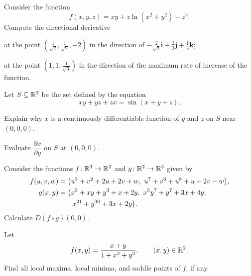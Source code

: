 \begin{problem}
Consider the function
\[
f(x, y, z)=xy+z\ln(x^2+y^2)-z^3.
\]
Compute the directional derivative
\begin{problemsubparts}
\item at the point $\left(\frac{1}{\sqrt2}, \frac{1}{\sqrt2}, -2\right)$ in the direction of $-\frac{2}{\sqrt2}\mathbf i+\frac23\mathbf j+\frac13\mathbf k$;
\item at the point $\left(1, 1, \frac{1}{\sqrt3}\right)$ in the direction of the maximum rate of increase of the function.
\end{problemsubparts}
\end{problem}

\begin{problem}
Let $S\subseteq\mathbb{R}^3$ be the set defined by the equation
\[
xy+yz+zx=\sin(x+y+z).
\]
\begin{problemsubparts}
\item Explain why $x$ is a continuously differentiable function of $y$ and $z$ on $S$ near $(0, 0, 0)$.
\item Evaluate $\dfrac{\partial x}{\partial y}$ on $S$ at $(0, 0, 0)$.
\end{problemsubparts}
\end{problem}

\begin{problem}
Consider the functions $f\colon\mathbb{R}^3\to\mathbb{R}^2$ and $g\colon\mathbb{R}^2\to\mathbb{R}^3$ given by
\[
\begin{aligned}
f(u, v, w)
&=\bigl(u^3+v^2+2u+2v+w,\ u^7+v^6+u^8+u+2v-w\bigr), \\
g(x, y)
&=\bigl(x^5+xy+y^3+x+2y,\ x^5y^7+y^7+3x+4y,\\
&\hspace{2.0em}x^{21}+y^{30}+3x+2y\bigr).
\end{aligned}
\]
Calculate $D(f\circ g)(0, 0)$.
\end{problem}

\begin{problem}
Let
\[
f(x, y)=\frac{x+y}{1+x^2+y^2},\qquad (x, y)\in\mathbb{R}^2.
\]
Find all local maxima, local minima, and saddle points of $f$, if any.
\end{problem}

